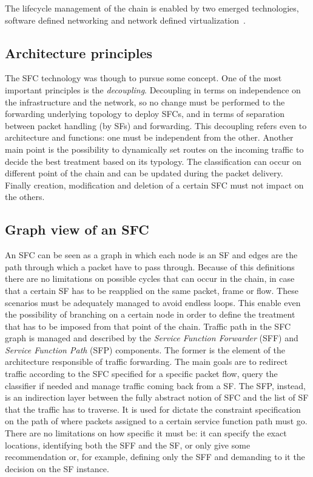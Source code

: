 The lifecycle management of the chain is enabled by two emerged technologies,
software defined networking and network defined
virtualization~\cite{medhat2017service}.

\subsection{Architecture principles}
The SFC technology was though to pursue some concept. One of the most important
principles is the \emph{decoupling}. Decoupling in terms on independence on the
infrastructure and the network, so no change must be performed to the forwarding
underlying topology to deploy SFCs, and in terms of separation between packet
handling (by SFs) and forwarding. This decoupling refers even to architecture
and functions: one must be independent from the other. Another main point is the
possibility to dynamically set routes on the incoming traffic to decide the best
treatment based on its typology. The classification can occur on different point
of the chain and can be updated during the packet delivery. Finally creation,
modification and deletion of a certain SFC must not impact on the others.

\subsection{Graph view of an SFC}
An SFC can be seen as a graph in which each node is an SF and edges are the path
through which a packet have to pass through. Because of this definitions there
are no limitations on possible cycles that can occur in the chain, in case that
a certain SF has to be reapplied on the same packet, frame or flow. These
scenarios must be adequately managed to avoid endless loops. This enable even
the possibility of branching on a certain node in order to define the treatment
that has to be imposed from that point of the chain. Traffic path in the SFC
graph is managed and described by the \emph{Service Function Forwarder} (SFF)
and \emph{Service Function Path} (SFP) components. The former is the element of
the architecture responsible of traffic forwarding. The main goals are to
redirect traffic according to the SFC specified for a specific packet flow,
query the classifier if needed and manage traffic coming back from a SF. The
SFP, instead, is an indirection layer between the fully abstract notion of SFC
and the list of SF that the traffic has to traverse. It is used for dictate the
constraint specification on the path of where packets assigned to a certain
service function path must go. There are no limitations on how specific it must
be: it can specify the exact locations, identifying both the SFF and the SF, or
only give some recommendation or, for example, defining only the SFF and
demanding to it the decision on the SF instance.


